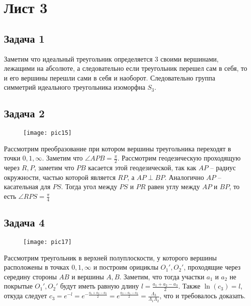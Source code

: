 \newpage		
\section*{Лист 3}
	\subsection*{Задача 1}
	\noindent
	Заметим что идеальный треугольник определяется 3 своими вершинами, лежащими на абсолюте, а следовательно если треугольник перешел сам в себя, то и его вершины перешли сами в себя и наоборот. Следовательно группа симметрий идеального треугольника изоморфна $S_{3}$.
	
	\subsection*{Задача 2}
	\begin{figure}[h!]
		\center\texttt{[image: pic15]}
	\end{figure}
	\noindent
	Рассмотрим преобразование при котором вершины треугольника переходят в точки $0,1,\infty$. Заметим что $\angle A P B = \frac{\pi}{2}$. Рассмотрим геодезическую проходящую через $R,P$, заметим что $PB$ касается этой геодезической, так как $AP$ -- радиус окружности, частью которой является $RP$, а $AP \perp BP$. Аналогично $AP$ -- касательная для $PS$. Тогда угол между $PS$ и $PR$ равен углу между $AP$ и $BP$, то есть $\angle RPS = \frac{\pi}{4}$ 
	
	\subsection*{Задача 4}
	\begin{figure}[h!]
		\center\texttt{[image: pic17]}
	\end{figure}
	\noindent
	Рассмотрим треугольник в верхней полуплоскости, у которого вершины расположены в точках $0,1,\infty$ и построим орициклы $O_1', O_2'$, проходящие через середину стороны $AB$ и вершины $A,B$. Заметим, что тогда участки $a_1$ и $a_2$ не покрытые $O_1', O_2'$ будут иметь равную длину $l = \frac{a_1 + a_2 - a_3}{2}$. Также $\ln(c_3) = l$, откуда следует $c_3 = e^{-l} = e^{-\frac{a_1 + a_2 - a_3}{2}} = e^{\frac{a_3 - a_1 - a_2}{2}} = \frac{\Lambda_3}{\Lambda_1 \Lambda_2}$, что и требовалось доказать.
	
	\newpage
